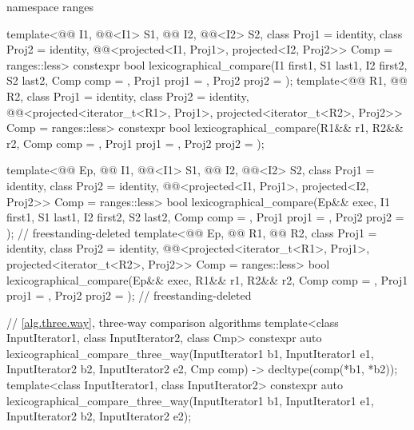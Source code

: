 \begin{codeblock}
{  namespace ranges {
    template<@@ I1, @@<I1> S1, @@ I2, @@<I2> S2,
             class Proj1 = identity, class Proj2 = identity,
             @@<projected<I1, Proj1>, projected<I2, Proj2>> Comp =
               ranges::less>
      constexpr bool
        lexicographical_compare(I1 first1, S1 last1, I2 first2, S2 last2,
                                Comp comp = {}, Proj1 proj1 = {}, Proj2 proj2 = {});
    template<@@ R1, @@ R2, class Proj1 = identity,
             class Proj2 = identity,
             @@<projected<iterator_t<R1>, Proj1>,
                                        projected<iterator_t<R2>, Proj2>> Comp = ranges::less>
      constexpr bool
        lexicographical_compare(R1&& r1, R2&& r2, Comp comp = {},
                                Proj1 proj1 = {}, Proj2 proj2 = {});

    template<@@ Ep, @@ I1, @@<I1> S1,
             @@ I2, @@<I2> S2,
             class Proj1 = identity, class Proj2 = identity,
             @@<projected<I1, Proj1>,
                                        projected<I2, Proj2>> Comp = ranges::less>
      bool lexicographical_compare(Ep&& exec, I1 first1, S1 last1, I2 first2, S2 last2,
                                   Comp comp = {}, Proj1 proj1 = {},
                                   Proj2 proj2 = {});                       // freestanding-deleted
    template<@@ Ep, @@ R1, @@ R2,
             class Proj1 = identity, class Proj2 = identity,
             @@<projected<iterator_t<R1>, Proj1>,
                                        projected<iterator_t<R2>, Proj2>> Comp = ranges::less>
      bool lexicographical_compare(Ep&& exec, R1&& r1, R2&& r2, Comp comp = {},
                                   Proj1 proj1 = {}, Proj2 proj2 = {});     // freestanding-deleted
  }

  // \ref{alg.three.way}, three-way comparison algorithms
  template<class InputIterator1, class InputIterator2, class Cmp>
    constexpr auto
      lexicographical_compare_three_way(InputIterator1 b1, InputIterator1 e1,
                                        InputIterator2 b2, InputIterator2 e2,
                                        Cmp comp)
        -> decltype(comp(*b1, *b2));
  template<class InputIterator1, class InputIterator2>
    constexpr auto
      lexicographical_compare_three_way(InputIterator1 b1, InputIterator1 e1,
                                        InputIterator2 b2, InputIterator2 e2);

}
\end{codeblock}

